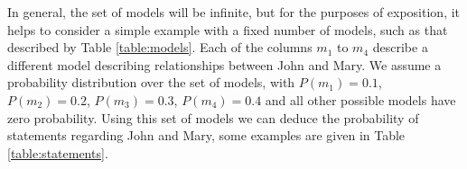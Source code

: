 \documentclass[11pt]{article}
\theoremstyle{definition}
\begin{document}



In general, the set of models will be infinite, but for the purposes
of exposition, it helps to consider a simple example with a fixed
number of models, such as that described by Table
\ref{table:models}. Each of the columns $m_1$ to $m_4$ describe a
different model describing relationships between John and Mary.  We
assume a probability distribution over the set of models, with $P(m_1)
= 0.1$, $P(m_2) = 0.2$, $P(m_3) = 0.3$, $P(m_4) = 0.4$ and all other
possible models have zero probability. Using this set of models we can
deduce the probability of statements regarding John and Mary, some
examples are given in Table \ref{table:statements}.
\end{document}

